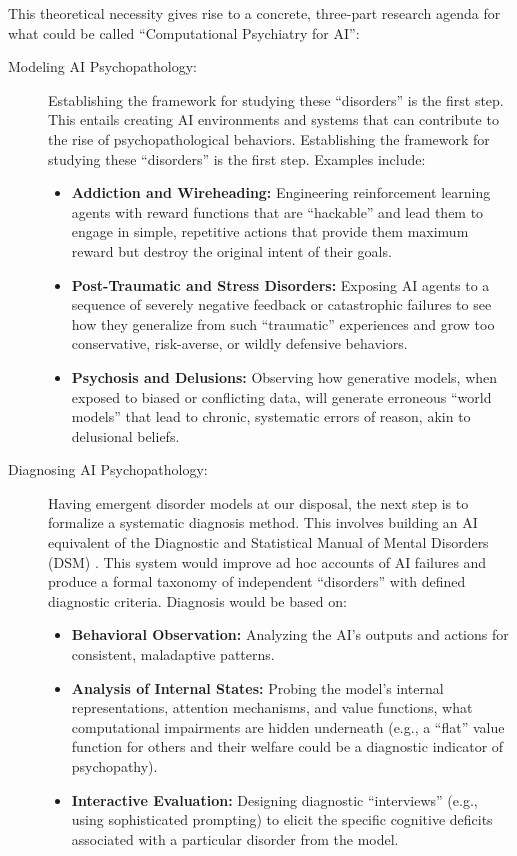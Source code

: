 \documentclass{article}
\begin{document}
This theoretical necessity gives rise to a concrete, three-part research agenda for what could be called “Computational Psychiatry for AI”:
\begin{description}
    \item[Modeling AI Psychopathology:] Establishing the framework for studying these “disorders” is the first step. This entails creating AI environments and systems that can contribute to the rise of psychopathological behaviors. Establishing the framework for studying these “disorders” is the first step. Examples include:
    \begin{itemize}
        \item \textbf{Addiction and Wireheading:} Engineering reinforcement learning agents with reward functions that are “hackable” and lead them to engage in simple, repetitive actions that provide them maximum reward but destroy the original intent of their goals.
        \item \textbf{Post-Traumatic and Stress Disorders:} Exposing AI agents to a sequence of severely negative feedback or catastrophic failures to see how they generalize from such “traumatic” experiences and grow too conservative, risk-averse, or wildly defensive behaviors.
        \item \textbf{Psychosis and Delusions:} Observing how generative models, when exposed to biased or conflicting data, will generate erroneous “world models” that lead to chronic, systematic errors of reason, akin to delusional beliefs.
    \end{itemize}
    \item[Diagnosing AI Psychopathology:] Having emergent disorder models at our disposal, the next step is to formalize a systematic diagnosis method. This involves building an AI equivalent of the Diagnostic and Statistical Manual of Mental Disorders (DSM) \citep{ref3}. This system would improve ad hoc accounts of AI failures and produce a formal taxonomy of independent “disorders” with defined diagnostic criteria. Diagnosis would be based on:
    \begin{itemize}
        \item \textbf{Behavioral Observation:} Analyzing the AI's outputs and actions for consistent, maladaptive patterns.
        \item \textbf{Analysis of Internal States:} Probing the model's internal representations, attention mechanisms, and value functions, what computational impairments are hidden underneath (e.g., a “flat” value function for others and their welfare could be a diagnostic indicator of psychopathy).
        \item \textbf{Interactive Evaluation:} Designing diagnostic “interviews” (e.g., using sophisticated prompting) to elicit the specific cognitive deficits associated with a particular disorder from the model.
    \end{itemize}
\end{description}
\end{document}
